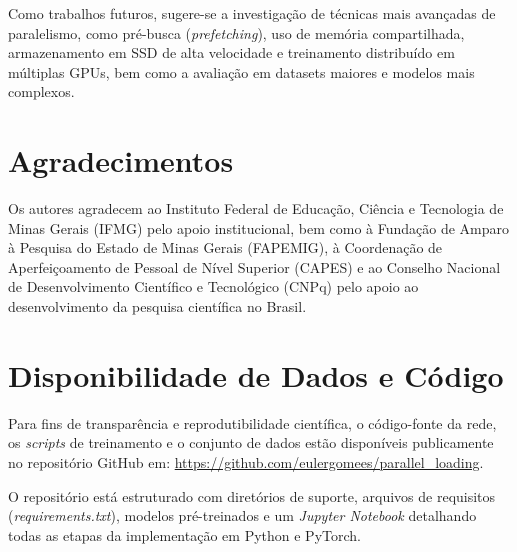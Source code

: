 \documentclass[a4paper,11pt]{article}
\begin{document}
Como trabalhos futuros, sugere-se a investigação de técnicas mais avançadas de paralelismo, como pré-busca (\textit{prefetching}), uso de memória compartilhada, armazenamento em SSD de alta velocidade e treinamento distribuído em múltiplas GPUs, bem como a avaliação em datasets maiores e modelos mais complexos.

\section{Agradecimentos}
Os autores agradecem ao Instituto Federal de Educação, Ciência e Tecnologia de Minas Gerais (IFMG) pelo apoio institucional, bem como à Fundação de Amparo à Pesquisa do Estado de Minas Gerais (FAPEMIG), à Coordenação de Aperfeiçoamento de Pessoal de Nível Superior (CAPES) e ao Conselho Nacional de Desenvolvimento Científico e Tecnológico (CNPq) pelo apoio ao desenvolvimento da pesquisa científica no Brasil.

\section*{Disponibilidade de Dados e Código} 

Para fins de transparência e reprodutibilidade científica, o código-fonte da rede, os \textit{scripts} de treinamento e o conjunto de dados estão disponíveis publicamente no repositório GitHub em: \url{https://github.com/eulergomees/parallel_loading}.

O repositório está estruturado com diretórios de suporte, arquivos de requisitos (\textit{requirements.txt}), modelos pré-treinados e um \textit{Jupyter Notebook} detalhando todas as etapas da implementação em Python e PyTorch.

~\\


\end{document}

